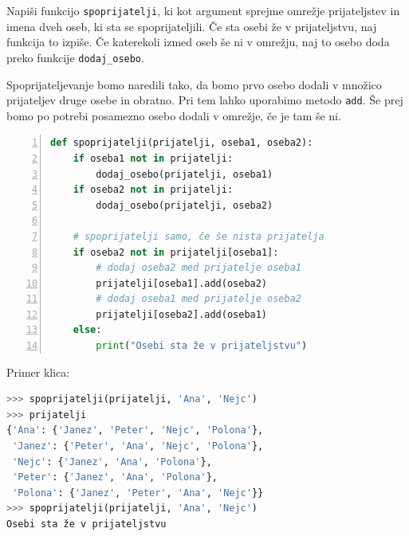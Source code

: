 \begin{zgled}
Napiši funkcijo \texttt{spoprijatelji}, ki kot argument sprejme omrežje prijateljstev in imena dveh oseb, ki sta se spoprijateljili. Če sta osebi že v prijateljstvu, naj funkcija to izpiše. Če katerekoli izmed oseb še ni v omrežju, naj to osebo doda preko funkcije \texttt{dodaj\_osebo}.
\end{zgled}
\begin{resitev}
Spoprijateljevanje bomo naredili tako, da bomo prvo osebo dodali v množico prijateljev druge osebe in obratno. Pri tem lahko uporabimo metodo \texttt{add}. Še prej bomo po potrebi posamezno osebo dodali v omrežje, če je tam še ni.
\begin{lstlisting}[language=Python, showstringspaces=false,numbers=left]
def spoprijatelji(prijatelji, oseba1, oseba2):
    if oseba1 not in prijatelji:
        dodaj_osebo(prijatelji, oseba1) 
    if oseba2 not in prijatelji:
        dodaj_osebo(prijatelji, oseba2) 
    
    # spoprijatelji samo, če še nista prijatelja
    if oseba2 not in prijatelji[oseba1]:
        # dodaj oseba2 med prijatelje oseba1
        prijatelji[oseba1].add(oseba2)
        # dodaj oseba1 med prijatelje oseba2
        prijatelji[oseba2].add(oseba1)
    else:
        print("Osebi sta že v prijateljstvu")
\end{lstlisting}
Primer klica:
\begin{lstlisting}[language=Python, showstringspaces=false]
>>> spoprijatelji(prijatelji, 'Ana', 'Nejc')
>>> prijatelji
{'Ana': {'Janez', 'Peter', 'Nejc', 'Polona'}, 
 'Janez': {'Peter', 'Ana', 'Nejc', 'Polona'}, 
 'Nejc': {'Janez', 'Ana', 'Polona'}, 
 'Peter': {'Janez', 'Ana', 'Polona'}, 
 'Polona': {'Janez', 'Peter', 'Ana', 'Nejc'}}
>>> spoprijatelji(prijatelji, 'Ana', 'Nejc')
Osebi sta že v prijateljstvu
\end{lstlisting}

\end{resitev}

